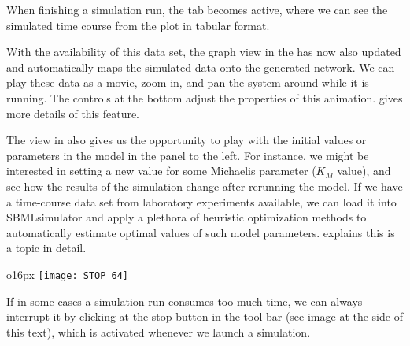 When finishing a simulation run, the tab  becomes active, where we can see the simulated time course from the plot in tabular format.

With the availability of this data set, the graph view in the  has now also updated and automatically maps the simulated data onto the generated network.
We can play these data as a movie, zoom in, and pan the system around while it is running.
The controls at the bottom adjust the properties of this animation.
 gives more details of this feature.

The view in  also gives us the opportunity to play with the initial values or parameters in the model in the panel to the left.
For instance, we might be interested in setting a new value for some Michaelis parameter ($K_M$ value), and see how the results of the simulation change after rerunning the model.
If we have a time-course data set from laboratory experiments available, we can load it into SBMLsimulator and apply a plethora of heuristic optimization methods to automatically estimate optimal values of such model parameters.
 explains this is a topic in detail.

\begin{wrapfigure}{o}{16px}
\vspace{\wrapfigspace}
\texttt{[image: STOP\_64]}
\end{wrapfigure}
If in some cases a simulation run consumes too much time, we can always interrupt it by clicking at the stop button in the tool-bar (see image at the side of this text), which is activated whenever we launch a simulation.

